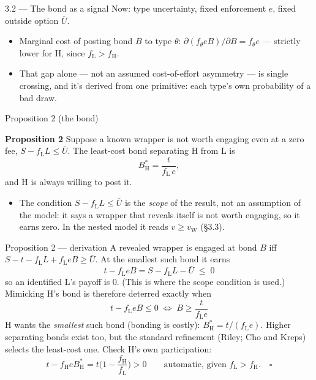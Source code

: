 \documentclass[11pt,aspectratio=169]{beamer}
\newcommand{\Ht}{\mathrm{H}}
\newcommand{\Lt}{\mathrm{L}}
\newcommand{\fH}{f_{\mathrm{H}}}
\newcommand{\fL}{f_{\mathrm{L}}}
\newcommand{\BH}{B^{*}_{\mathrm{H}}}
\newcommand{\Ubar}{\bar U}
\newcommand{\vW}{v_{\mathrm{W}}}
\newcommand{\PropTitle}[1]{\textbf{Proposition #1}}
\begin{document}
\begin{frame}{3.2 --- The bond as a signal}
Now: type uncertainty, fixed enforcement $e$, fixed outside option $\Ubar$.
\vfill
\begin{itemize}
  \item Marginal cost of posting bond $B$ to type $\theta$: $\partial(f_\theta e B)/\partial B = f_\theta e$ --- \alert{strictly lower for $\Ht$}, since $\fL>\fH$.
  \item That gap alone --- not an assumed cost-of-effort asymmetry --- is single crossing, and it's derived from one primitive: each type's own probability of a bad draw.
\end{itemize}
\end{frame}

\begin{frame}{Proposition 2 (the bond)}
\begin{exampleblock}{\PropTitle{2}}
Suppose a known wrapper is not worth engaging even at a zero fee, $S-\fL L\le\Ubar$. The least-cost bond separating $\Ht$ from $\Lt$ is
\begin{equation*}
  \BH = \frac{t}{\fL\, e},
\end{equation*}
and $\Ht$ is always willing to post it.
\end{exampleblock}
\vfill
\begin{itemize}
  \item The condition $S-\fL L\le\Ubar$ is the \emph{scope} of the result, not an assumption of the model: it says a wrapper that reveals itself is not worth engaging, so it earns zero. In the nested model it reads $v\ge\vW$ (\S3.3).
\end{itemize}
\end{frame}

\begin{frame}{Proposition 2 --- derivation}
\small
A revealed wrapper is engaged at bond $B$ iff $S-t-\fL L+\fL eB\ge\Ubar$. At the smallest such bond it earns
\begin{equation*}
  t-\fL eB = S-\fL L-\Ubar \;\le\; 0
\end{equation*}
so an identified $\Lt$'s payoff is \alert{0}. (This is where the scope condition is used.)
\pause
\vspace{4pt}
Mimicking $\Ht$'s bond is therefore deterred exactly when
\begin{equation*}
  t-\fL eB\le 0 \;\iff\; B\ge\frac{t}{\fL e}
\end{equation*}
\pause
$\Ht$ wants the \emph{smallest} such bond (bonding is costly): $\BH=t/(\fL e)$. Higher separating bonds exist too, but the standard refinement (Riley; Cho and Kreps) selects the least-cost one.
\pause
\vspace{4pt}
Check $\Ht$'s own participation:
\begin{equation*}
  t-\fH e\BH = t\Big(1-\frac{\fH}{\fL}\Big) > 0 \qquad\text{automatic, given } \fL>\fH. \quad\square
\end{equation*}
\end{frame}
\end{document}
